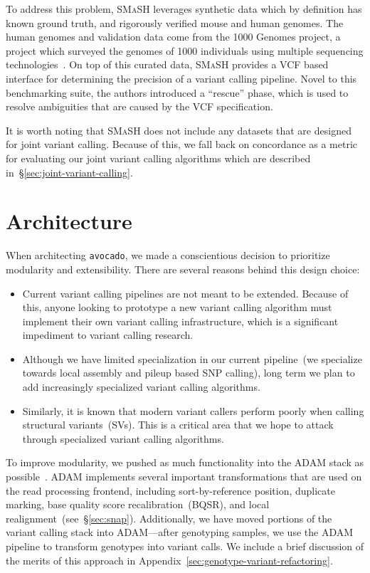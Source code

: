 \documentclass{acm_proc_article-sp}
\begin{document}
To address this problem, \textsc{SMaSH} leverages synthetic data which by definition has known ground truth, and rigorously verified
mouse and human genomes. The human genomes and validation data come from the 1000 Genomes project, a project which surveyed
the genomes of 1000 individuals using multiple sequencing technologies~\cite{siva08}. On top of this curated data, \textsc{SMaSH}
provides a VCF based interface for determining the precision of a variant calling pipeline. Novel to this benchmarking suite, the authors
introduced a ``rescue'' phase, which is used to resolve ambiguities that are caused by the VCF specification.

It is worth noting that \textsc{SMaSH} does not include any datasets that are designed for joint variant calling. Because of this, we fall back
on concordance as a metric for evaluating our joint variant calling algorithms which are described in~\S\ref{sec:joint-variant-calling}.

\section{Architecture}
\label{sec:architecture}


When architecting \texttt{avocado}, we made a conscientious decision to prioritize modularity and extensibility. There are several reasons
behind this design choice:

\begin{itemize}
\item Current variant calling pipelines are not meant to be extended. Because of this, anyone looking to prototype a new variant calling
algorithm must implement their own variant calling infrastructure, which is a significant impediment to variant calling research.
\item Although we have limited specialization in our current pipeline~(we specialize towards local assembly and pileup based SNP
calling), long term we plan to add increasingly specialized variant calling algorithms.
\item Similarly, it is known that modern variant callers perform poorly when calling structural variants~(SVs). This is a critical area that we
hope to attack through specialized variant calling algorithms.
\end{itemize}

To improve modularity, we pushed as much functionality into the ADAM stack as possible~\cite{massie13}. ADAM implements several
important transformations that are used on the read processing frontend, including sort-by-reference position, duplicate marking, base
quality score recalibration~(BQSR), and local realignment~(see~\S\ref{sec:snap}). Additionally, we have moved portions of the variant
calling stack into ADAM---after genotyping samples, we use the ADAM pipeline to transform genotypes into variant calls. We include
a brief discussion of the merits of this approach in Appendix~\ref{sec:genotype-variant-refactoring}.
\end{document}
